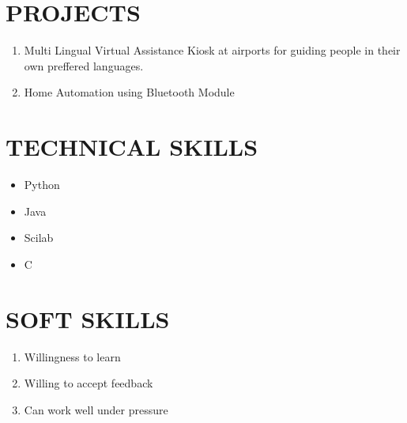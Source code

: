 \documentclass{article}
\begin{document}
\section{PROJECTS}
\begin{enumerate}
               
                \item Multi Lingual Virtual Assistance Kiosk at airports for guiding people in their own preffered languages.
                \item Home Automation using Bluetooth Module
\end{enumerate}  
 

\section{TECHNICAL SKILLS}
\begin{itemize}
                \item Python
                \item Java
                \item Scilab
                \item C
\end{itemize}
\section{SOFT SKILLS}
\begin{enumerate}
                \item Willingness to learn
                \item Willing to accept feedback
                \item Can work well under pressure
                
\end{enumerate}           
\end{document}
